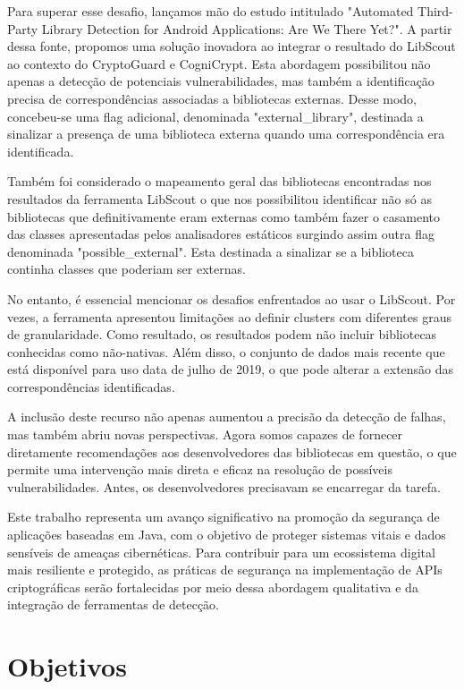 Para superar esse desafio, lançamos mão do estudo intitulado "Automated Third-Party Library Detection for Android Applications: Are We There Yet?". \cite{perception_developers} A partir dessa fonte, propomos uma solução inovadora ao integrar o resultado do LibScout ao contexto do CryptoGuard e CogniCrypt. Esta abordagem possibilitou não apenas a detecção de potenciais vulnerabilidades, mas também a identificação precisa de correspondências associadas a bibliotecas externas. Desse modo, concebeu-se uma flag adicional, denominada "external\_library", destinada a sinalizar a presença de uma biblioteca externa quando uma correspondência era identificada.

Também foi considerado o mapeamento geral das bibliotecas encontradas nos resultados da ferramenta LibScout \cite{LibScout} o que nos possibilitou identificar não só as bibliotecas que definitivamente eram externas como também fazer o casamento das classes apresentadas pelos analisadores estáticos surgindo assim outra flag denominada "possible\_external". Esta destinada a sinalizar se a biblioteca continha classes que poderiam ser externas. 

No entanto, é essencial mencionar os desafios enfrentados ao usar o LibScout. Por vezes, a ferramenta apresentou limitações ao definir clusters com diferentes graus de granularidade. Como resultado, os resultados podem não incluir bibliotecas conhecidas como não-nativas. Além disso, o conjunto de dados mais recente que está disponível para uso data de julho de 2019, o que pode alterar a extensão das correspondências identificadas.

A inclusão deste recurso não apenas aumentou a precisão da detecção de falhas, mas também abriu novas perspectivas. Agora somos capazes de fornecer diretamente recomendações aos desenvolvedores das bibliotecas em questão, o que permite uma intervenção mais direta e eficaz na resolução de possíveis vulnerabilidades. Antes, os desenvolvedores precisavam se encarregar da tarefa.

Este trabalho representa um avanço significativo na promoção da segurança de aplicações baseadas em Java, com o objetivo de proteger sistemas vitais e dados sensíveis de ameaças cibernéticas. Para contribuir para um ecossistema digital mais resiliente e protegido, as práticas de segurança na implementação de APIs criptográficas serão fortalecidas por meio dessa abordagem qualitativa e da integração de ferramentas de detecção.

\section{Objetivos}

